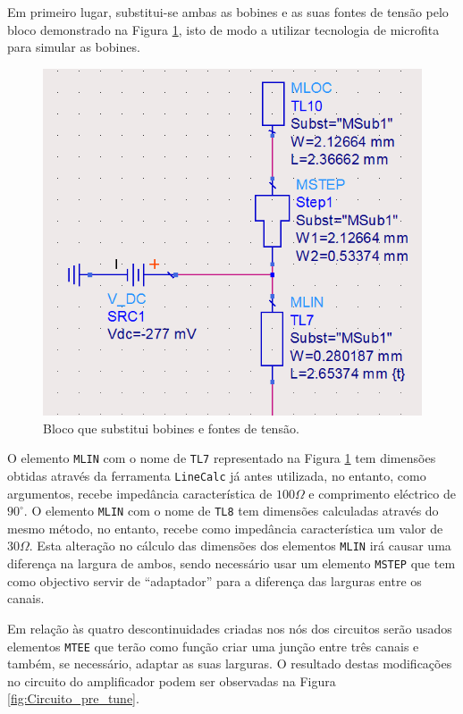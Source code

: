 \documentclass[11pt]{article}
\numberwithin{equation}{section}
\begin{document}
Em primeiro lugar, substitui-se ambas as bobines e as suas fontes de tensão pelo bloco demonstrado na Figura \ref{fig:bobine}, isto de modo a utilizar tecnologia de microfita para simular as bobines. 

\begin{figure}[H]
	\centering
	\includegraphics[keepaspectratio=true, scale=0.45]{exps/bobine}
	\vspace{-0.5em}
	\caption{Bloco que substitui bobines e fontes de tensão.}
	\vspace{-0.8em}
	\label{fig:bobine}
\end{figure}

O elemento \texttt{MLIN} com o nome de \texttt{TL7} representado na Figura \ref{fig:bobine} tem dimensões obtidas através da ferramenta \texttt{LineCalc} já antes utilizada, no entanto, como argumentos, recebe impedância característica de $100 \Omega$ e comprimento eléctrico de $90^{\circ}$. O elemento \texttt{MLIN} com o nome de \texttt{TL8} tem dimensões calculadas através do mesmo método, no entanto, recebe como impedância característica um valor de $30 \Omega$. Esta alteração no cálculo das dimensões dos elementos \texttt{MLIN} irá causar uma diferença na largura de ambos, sendo necessário usar um elemento \texttt{MSTEP} que tem como objectivo servir de ``adaptador'' para a diferença das larguras entre os canais.

Em relação às quatro descontinuidades criadas nos nós dos circuitos serão usados elementos \texttt{MTEE} que terão como função criar uma junção entre três canais e também, se necessário, adaptar as suas larguras. O resultado destas modificações no circuito do amplificador podem ser observadas na Figura \ref{fig:Circuito_pre_tune}.
\end{document}
